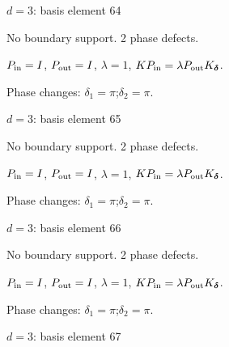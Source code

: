 \vfill
{\footnotesize\texttt{}}
\newpage
{}
{\Large $d=3$: basis element 64}\par
No boundary support. 2 phase defects.
\begin{center}
\end{center}
\vspace{-1mm}
$P_{\rm in}=I$, \quad $P_{\rm out}=I$, \quad $\lambda=1$, \qquad $K P_{\rm in}=\lambda P_{\rm out}K_{\boldsymbol\delta}$.
\par\smallskip\begin{minipage}{.98\linewidth}\small Phase changes: $\delta_{1}=\pi$;\quad $\delta_{2}=\pi$.\end{minipage}
\vfill
{\footnotesize\texttt{}}
\newpage
{}
{\Large $d=3$: basis element 65}\par
No boundary support. 2 phase defects.
\begin{center}
\end{center}
\vspace{-1mm}
$P_{\rm in}=I$, \quad $P_{\rm out}=I$, \quad $\lambda=1$, \qquad $K P_{\rm in}=\lambda P_{\rm out}K_{\boldsymbol\delta}$.
\par\smallskip\begin{minipage}{.98\linewidth}\small Phase changes: $\delta_{1}=\pi$;\quad $\delta_{2}=\pi$.\end{minipage}
\vfill
{\footnotesize\texttt{}}
\newpage
{}
{\Large $d=3$: basis element 66}\par
No boundary support. 2 phase defects.
\begin{center}
\end{center}
\vspace{-1mm}
$P_{\rm in}=I$, \quad $P_{\rm out}=I$, \quad $\lambda=1$, \qquad $K P_{\rm in}=\lambda P_{\rm out}K_{\boldsymbol\delta}$.
\par\smallskip\begin{minipage}{.98\linewidth}\small Phase changes: $\delta_{1}=\pi$;\quad $\delta_{2}=\pi$.\end{minipage}
\vfill
{\footnotesize\texttt{}}
\newpage
{}
{\Large $d=3$: basis element 67}\par
